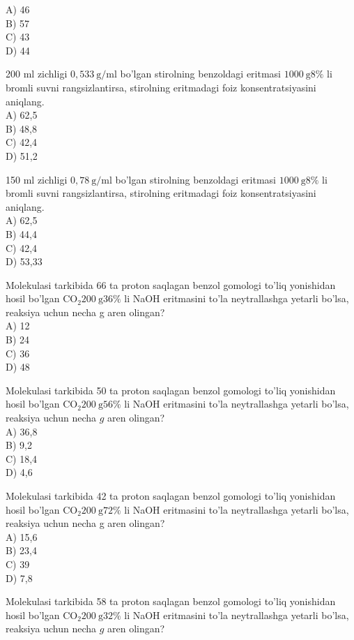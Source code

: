 A) 46\\
B) 57\\
C) 43\\
D) 44
  \item 200 ml zichligi $0,533 \mathrm{~g} / \mathrm{ml}$ bo'lgan stirolning benzoldagi eritmasi $1000 \mathrm{~g} 8 \%$ li bromli suvni rangsizlantirsa, stirolning eritmadagi foiz konsentratsiyasini aniqlang.\\
A) 62,5\\
B) 48,8\\
C) 42,4\\
D) 51,2
  \item 150 ml zichligi $0,78 \mathrm{~g} / \mathrm{ml}$ bo'lgan stirolning benzoldagi eritmasi $1000 \mathrm{~g} 8 \%$ li bromli suvni rangsizlantirsa, stirolning eritmadagi foiz konsentratsiyasini aniqlang.\\
A) 62,5\\
B) 44,4\\
C) 42,4\\
D) 53,33
  \item Molekulasi tarkibida 66 ta proton saqlagan benzol gomologi to'liq yonishidan hosil bo'lgan $\mathrm{CO}_{2} 200 \mathrm{~g} 36 \%$ li NaOH eritmasini to'la neytrallashga yetarli bo'lsa, reaksiya uchun necha g aren olingan?\\
A) 12\\
B) 24\\
C) 36\\
D) 48
  \item Molekulasi tarkibida 50 ta proton saqlagan benzol gomologi to'liq yonishidan hosil bo'lgan $\mathrm{CO}_{2} 200 \mathrm{~g} 56 \%$ li NaOH eritmasini to'la neytrallashga yetarli bo'lsa, reaksiya uchun necha $g$ aren olingan?\\
A) 36,8\\
B) 9,2\\
C) 18,4\\
D) 4,6
  \item Molekulasi tarkibida 42 ta proton saqlagan benzol gomologi to'liq yonishidan hosil bo'lgan $\mathrm{CO}_{2} 200 \mathrm{~g} 72 \%$ li NaOH eritmasini to'la neytrallashga yetarli bo'lsa, reaksiya uchun necha g aren olingan?\\
A) 15,6\\
B) 23,4\\
C) 39\\
D) 7,8
  \item Molekulasi tarkibida 58 ta proton saqlagan benzol gomologi to'liq yonishidan hosil bo'lgan $\mathrm{CO}_{2} 200 \mathrm{~g} 32 \%$ li NaOH eritmasini to'la neytrallashga yetarli bo'lsa, reaksiya uchun necha $g$ aren olingan?\\
